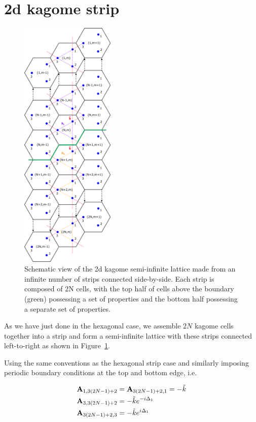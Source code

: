 \section{2d kagome strip}

\begin{figure}[!h]
\centering
\includegraphics[width=0.4\textwidth]{imgs/kagomestripmodel.png}
\caption{\label{fig:kagomestripmodel} Schematic view of the 2d kagome
  semi-infinite lattice made from an infinite number of strips connected
  side-by-side. Each strip is composed of 2N cells, with the top half of cells
  above the boundary (green) possessing a set of properties and the bottom half
  possessing a separate set of properties.}
\end{figure}

As we have just done in the hexagonal case, we assemble $2N$ kagome cells
together into a strip and form a semi-infinite lattice with these strips
connected left-to-right as shown in Figure~\ref{fig:kagomestripmodel}.

Using the same conventions as the hexagonal strip case and similarly imposing
periodic boundary conditions at the top and bottom edge, i.e.

\begin{align}
  \mathbf{A}_{1,3(2N-1)+2}&=\mathbf{A}_{3(2N-1)+2,1}=-\tilde{k} \\
  \mathbf{A}_{3,3(2N-1)+2}&=-\tilde{k}e^{-i\Delta_1} \\
  \mathbf{A}_{3(2N-1)+2,3}&=-\tilde{k}e^{i\Delta_1} 
\end{align} 

